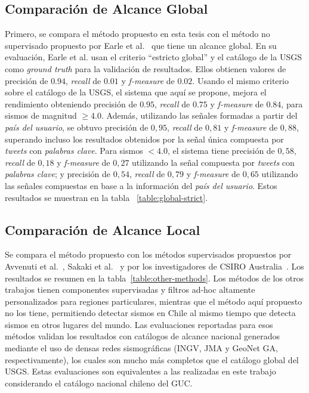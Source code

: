 \subsection{Comparación de Alcance Global}

Primero, se compara el método propuesto en esta tesis con el método no supervisado propuesto por Earle et al.~\cite{earle2010omg,earle2012twitter} que tiene un alcance global. En su evaluación, Earle et al. usan el criterio ``estricto global'' y el catálogo de la USGS como {\em ground truth} para la validación de resultados. Ellos obtienen valores de precisión de $0.94$, {\em recall} de $0.01$ y {\em f-measure} de $0.02$. Usando el mismo criterio sobre el catálogo de la USGS, el sistema que aquí se propone, mejora el rendimiento obteniendo precisión de $0.95$, {\em recall} de $0.75$ y {\em f-measure}  de $0.84$, para sismos de magnitud $\geq 4.0$. Además, utilizando las señales formadas a partir del {\em país del usuario}, se obtuvo precisión de $0,95$, {\em recall} de $0,81$ y {\em f-measure} de $0,88$, superando incluso los resultados obtenidos por la señal única compuesta por \textit{tweets} con {\em palabras clave}. Para sismos $<4.0$, el sistema tiene precisión de $0,58$, {\em recall} de $0,18$ y {\em f-measure}  de $0,27$ utilizando la señal compuesta por \textit{tweets} con {\em palabras clave}; y precisión de $0,54$, {\em recall} de $0,79$ y {\em f-measure} de $0,65$ utilizando las señales compuestas en base a la información del {\em país del usuario}. Estos resultados se muestran en la tabla ~\ref{table:global-strict}.


\subsection{Comparación de Alcance Local}

Se compara el método propuesto con los métodos supervisados propuestos por Avvenuti et al.~\cite{avvenuti2014earthquake,avvenuti2014ears}, Sakaki et al.~\cite{sakaki2013tweet,sakaki2010earthquake} y por los investigadores de CSIRO Australia~\cite{yin2012using,robinson2013sensitive}.
%
Los resultados se resumen en la tabla~\ref{table:other-methods}. 
%
Los métodos de los otros trabajos tienen componentes supervisadas y filtros ad-hoc altamente personalizados para regiones particulares, mientras que el método aquí propuesto no los tiene, permitiendo detectar sismos en Chile al mismo tiempo que detecta sismos en otros lugares del mundo. 
%
Las evaluaciones reportadas para esos métodos validan los resultados con catálogos de alcance nacional generados mediante el uso de densas redes sismográficas (INGV, JMA y GeoNet GA, respectivamente), los cuales son mucho más completos que el catálogo global del USGS. Estas evaluaciones son equivalentes a las realizadas en este trabajo considerando el catálogo nacional chileno del GUC. 

